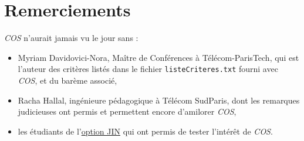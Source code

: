 \documentclass[11pt]{article}
\begin{document}
\section{Remerciements}
\label{sec-9}
\emph{COS} n'aurait jamais vu le jour sans :
\begin{itemize}
\item Myriam Davidovici-Nora, Maître de Conférences à Télécom-ParisTech,
qui est l'auteur des critères listés dans le fichier
\verb~listeCriteres.txt~ fourni avec \emph{COS}, et du barème associé,
\item Racha Hallal, ingénieure pédagogique à Télécom SudParis, dont les
remarques judicieuses ont permis et permettent encore d'amilorer
\emph{COS},
\item les étudiants de l'\href{http://jin.telecom-sudparis.eu/}{option JIN} qui ont permis de tester l'intérêt de
\emph{COS}.
\end{itemize}
\end{document}
